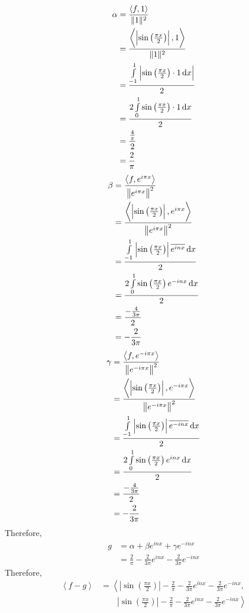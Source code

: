 \documentclass[fleqn, a4paper, 11pt, oneside]{amsart}
\theoremstyle{definition}
\theoremstyle{theorem}
\begin{document}
\begin{solution}
	\begin{align*}
		\alpha &= \frac{\left\langle f,1 \right\rangle}{\|1\|^2}\\
		&= \frac{\left\langle \left| \sin\left( \frac{\pi x}{2} \right) \right|,1 \right\rangle}{\|1\|^2}\\
		&= \frac{\int\limits_{-1}^{1} \left| \sin\left( \frac{\pi x}{2} \right) \cdot 1 \dif x \right|}{2}\\
		&= \frac{2 \int\limits_{0}^{1} \sin\left( \frac{\pi x}{2} \right) \cdot 1 \dif x}{2}\\
		&= \frac{\frac{4}{\pi}}{2}\\
		&= \frac{2}{\pi}
	\end{align*}
	\begin{align*}
		\beta &= \frac{\left\langle f,e^{i \pi x} \right\rangle}{\left\| e^{i \pi x} \right\|^2}\\
		&= \frac{\left\langle \left| \sin\left( \frac{\pi x}{2} \right) \right|,e^{i \pi x} \right\rangle}{\left\| e^{i \pi x} \right\|^2}\\
		&= \frac{\int\limits_{-1}^{1} \left| \sin\left( \frac{\pi x}{2} \right) \right| \overline{e^{i n x}} \dif x}{2}\\
		&= \frac{2 \int\limits_{0}^{1} \sin\left( \frac{\pi x}{2} \right) e^{-i n x} \dif x}{2}\\
		&= \frac{-\frac{4}{3 \pi}}{2}\\
		&= -\frac{2}{3 \pi}
	\end{align*}
	\begin{align*}
		\gamma &= \frac{\left\langle f,e^{-i \pi x} \right\rangle}{\left\| e^{-i \pi x} \right\|^2}\\
		&= \frac{\left\langle \left| \sin\left( \frac{\pi x}{2} \right) \right|,e^{-i \pi x} \right\rangle}{\left\| e^{-i \pi x} \right\|^2}\\
		&= \frac{\int\limits_{-1}^{1} \left| \sin\left( \frac{\pi x}{2} \right) \right| \overline{e^{-i n x}} \dif x}{2}\\
		&= \frac{2 \int\limits_{0}^{1} \sin\left( \frac{\pi x}{2} \right) e^{i n x} \dif x}{2}\\
		&= \frac{-\frac{4}{3 \pi}}{2}\\
		&= -\frac{2}{3 \pi}
	\end{align*}
	Therefore,
	\begin{align*}
		g &= \alpha + \beta e^{i n x} + \gamma e^{-i n x}\\
		&= \frac{2}{\pi} - \frac{2}{3 \pi} e^{i n x} - \frac{2}{3 \pi} e^{-i n x}
	\end{align*}
	Therefore,
	\begin{align*}
		\left\langle f - g \right\rangle &= \left\langle \left| \sin\left( \frac{\pi x}{2} \right) \right| - \frac{2}{\pi} - \frac{2}{3 \pi} e^{i n x} - \frac{2}{3 \pi} e^{-i n x} , \right.\\
		&\quad \quad \left. \left| \sin\left( \frac{\pi x}{2} \right) \right| - \frac{2}{\pi} - \frac{2}{3 \pi} e^{i n x} - \frac{2}{3 \pi} e^{-i n x} \right\rangle
	\end{align*}
\end{solution}
\end{document}
